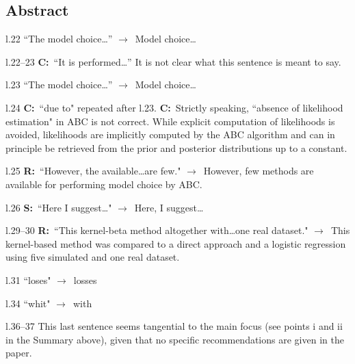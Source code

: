 \documentclass[11pt]{article}
\newenvironment{my_description}
{\begin{description}
  \setlength{\itemsep}{2pt}
  \setlength{\parskip}{0pt}
  \setlength{\parsep}{0pt}}
{\end{description}}
\newcommand{\ra}{$\rightarrow$\ }
\newcommand{\C}{\textbf{C:}\ }
\newcommand{\R}{\textbf{R:}\ }
\newcommand{\V}{\textbf{S:}\ }
\begin{document}
\subsection{Abstract}

\begin{my_description}
	\item[l.22] ``The model choice\dots'' \ra Model choice\dots
	\item[l.22--23] \C ``It is performed\dots'' It is not clear what this sentence is meant to say.
	\item[l.23] ``The model choice\dots'' \ra Model choice\dots
	\item[l.24] \C ``due to" repeated after l.23. \C Strictly speaking, ``absence of likelihood estimation" in ABC is not correct. While explicit computation of likelihoods is avoided, likelihoods are implicitly computed by the ABC algorithm and can in principle be retrieved from the prior and posterior distributions up to a constant.
	\item[l.25] \R ``However, the available\dots are few." \ra However, few methods are available for performing model choice by ABC.
	\item[l.26] \V ``Here I suggest\dots" \ra Here, I suggest\dots
	\item[l.29--30] \R ``This kernel-beta method altogether with\dots one real dataset." \ra This kernel-based method was compared to  a direct approach and a logistic regression using five simulated and one real dataset.
	\item[l.31] ``loses" \ra losses
	\item[l.34] ``whit" \ra with
	\item[l.36--37] This last sentence seems tangential to the main focus (see points i and ii in the Summary above), given that no specific recommendations are given in the paper.
\end{my_description}
\end{document}
